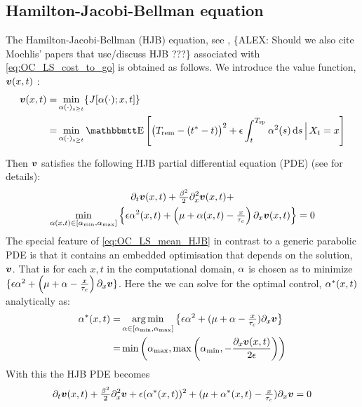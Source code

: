 \documentclass{article}
\begin{document}
\subsection{Hamilton-Jacobi-Bellman equation}
The Hamilton-Jacobi-Bellman (HJB) equation,
see \cite{Fleming1975,Evansb,Krylov2008}, \{ALEX: Should we also cite
Moehlis' papers that use/discuss HJB \cite{Nabi2013a,Danzl2009}???\}
associated with \cref{eq:OC_LS_cost_to_go} is obtained as follows. We introduce the value function, ${ \boldsymbol{v} }(x,t)$
:
\begin{align}
\v(x,t) =&
 \min_{\a(\cdot)_{s \geq t}}
 \{J[\a(\cdot); x,t] \}
\notag
\\
=&
\min_{\a(\cdot)_{s \geq t}}
\Exp\left[
\big(\trem - (\T-t) \big)^2 
+
\e \int_t^\ts  \a^2(s) \intd{s}
\,\Big|\,X_t = x
\right]
\label{eq:OC_LS_mean_value}
\end{align}

Then ${ \boldsymbol{v} }$ satisfies the following HJB partial differential equation (PDE) (see
\cite{Fleming1975,Evansb,Krylov2008} for details):
\begin{equation}
\begin{gathered}
{\partial}_t { \boldsymbol{v} }(x,t) + \tfrac{{\beta}^2}{2} {\partial}_x^2 { \boldsymbol{v} }(x,t) + \\
\min_{{\alpha}(x,t) \in [{ {\alpha}_{\textrm{min}} },
{ {\alpha}_{\textrm{max}} }]}\Big\{ {\epsilon} {\alpha}^2 (x,t)+ \left({\mu } + {\alpha}(x,t)-\tfrac{x}{{ \tau_{c} }}\right) {\partial}_x
{ \boldsymbol{v} }(x,t) \Big\} = 0
\label{eq:OC_LS_mean_HJB}
\end{gathered}
\end{equation}
The special feature of \cref{eq:OC_LS_mean_HJB} in contrast to a generic
parabolic PDE is that it contains an embedded optimisation that depends on the
solution, ${ \boldsymbol{v} }$. That is for each $x,t$ in the computational domain,
${\alpha}$ is chosen as to minimize $\{{\epsilon} {\alpha}^2 + \left({\mu } + {\alpha} - \tfrac{x}{{ \tau_{c} }}\right) {\partial}_x { \boldsymbol{v} } \}$. 
Here the we can solve for the optimal control, ${\alpha}^*(x,t)$ analytically as:
\begin{align}
\a^*(x,t)  =& \argmin_{\a \in [\amin, \amax]}\big\{\e \a^2 + (\m + \a-\tfrac{x}{\tc}) \di_x\v\big\}
\notag
\\
=&
\min \left(\amax, \max\left(\amin, -\frac{\di_x\v(x,t)}{2\e}\right)\right)
\label{eq:OC_LS_variance_energy_quadratic_control}
\end{align}
With this the HJB PDE becomes
\begin{equation}
{\partial}_t { \boldsymbol{v} }(x,t) + \tfrac{{\beta}^2}{2} {\partial}_x^2{ \boldsymbol{v} }+
{\epsilon} ({ {\alpha}^* }(x,t))^2 + ({\mu } + { {\alpha}^* }(x,t)-\tfrac{x}{{ \tau_{c} }}) {\partial}_x{ \boldsymbol{v} }
= 0
\label{eq:OC_LS_mean_HJB_bounded_control}
\end{equation}
\end{document}
